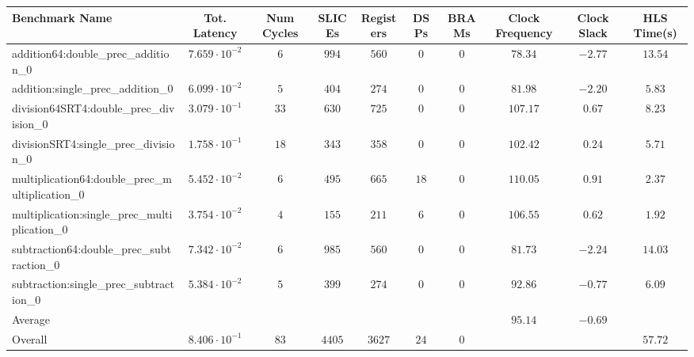 \begin{tabular}{|l|c|c|c|c|c|c|c|c|c|}
\hline
Benchmark Name                                   & Tot. Latency            & Num Cycles & SLICEs   & Registers & DSPs   & BRAMs & Clock Frequency & Clock Slack & HLS Time(s) \\
\hline
addition64:double\_prec\_addition\_0             & $ 7.659 \cdot 10^{-2} $ & $ 6      $ & $ 994  $ & $ 560   $ & $ 0  $ & $ 0 $ & $ 78.34       $ & $ -2.77   $ & $ 13.54   $ \\
addition:single\_prec\_addition\_0               & $ 6.099 \cdot 10^{-2} $ & $ 5      $ & $ 404  $ & $ 274   $ & $ 0  $ & $ 0 $ & $ 81.98       $ & $ -2.20   $ & $ 5.83    $ \\
division64SRT4:double\_prec\_division\_0         & $ 3.079 \cdot 10^{-1} $ & $ 33     $ & $ 630  $ & $ 725   $ & $ 0  $ & $ 0 $ & $ 107.17      $ & $ 0.67    $ & $ 8.23    $ \\
divisionSRT4:single\_prec\_division\_0           & $ 1.758 \cdot 10^{-1} $ & $ 18     $ & $ 343  $ & $ 358   $ & $ 0  $ & $ 0 $ & $ 102.42      $ & $ 0.24    $ & $ 5.71    $ \\
multiplication64:double\_prec\_multiplication\_0 & $ 5.452 \cdot 10^{-2} $ & $ 6      $ & $ 495  $ & $ 665   $ & $ 18 $ & $ 0 $ & $ 110.05      $ & $ 0.91    $ & $ 2.37    $ \\
multiplication:single\_prec\_multiplication\_0   & $ 3.754 \cdot 10^{-2} $ & $ 4      $ & $ 155  $ & $ 211   $ & $ 6  $ & $ 0 $ & $ 106.55      $ & $ 0.62    $ & $ 1.92    $ \\
subtraction64:double\_prec\_subtraction\_0       & $ 7.342 \cdot 10^{-2} $ & $ 6      $ & $ 985  $ & $ 560   $ & $ 0  $ & $ 0 $ & $ 81.73       $ & $ -2.24   $ & $ 14.03   $ \\
subtraction:single\_prec\_subtraction\_0         & $ 5.384 \cdot 10^{-2} $ & $ 5      $ & $ 399  $ & $ 274   $ & $ 0  $ & $ 0 $ & $ 92.86       $ & $ -0.77   $ & $ 6.09    $ \\
\hline
Average                                          & $                     $ & $        $ & $      $ & $       $ & $    $ & $   $ & $ 95.14       $ & $ -0.69   $ & $         $ \\
\hline
Overall                                          & $ 8.406 \cdot 10^{-1} $ & $ 83     $ & $ 4405 $ & $ 3627  $ & $ 24 $ & $ 0 $ & $             $ & $         $ & $ 57.72   $ \\
\hline
\end{tabular}
